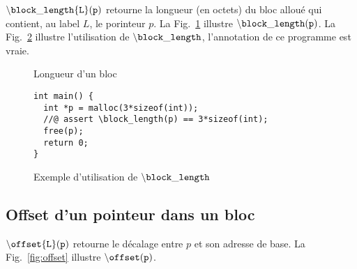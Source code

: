 ${\tt \backslash block\_length\{L\}(p)}$ retourne la longueur (en octets) du
bloc alloué qui contient, au label $L$, le porinteur $p$. La
Fig.~\ref{fig:block-length} illustre ${\tt \backslash block\_length(p)}$. La
Fig.~\ref{fig:block-length-example} illustre l'utilisation de
${\tt \backslash block\_length}$, l'annotation de ce programme est vraie.


\begin{figure}[h]
  \begin{center}
  \end{center}
  \caption{Longueur d'un bloc}
  \label{fig:block-length}
\end{figure}


\begin{figure}[h]
\begin{lstlisting}
int main() {
  int *p = malloc(3*sizeof(int));
  //@ assert \block_length(p) == 3*sizeof(int);
  free(p);
  return 0;
}
\end{lstlisting}
\caption{Exemple d'utilisation de ${\tt \backslash block\_length}$}
\label{fig:block-length-example}
\end{figure}



\subsection{Offset d'un pointeur dans un bloc}

${\tt \backslash offset\{L\}(p)}$ retourne le décalage entre $p$ et son adresse
de base. La Fig.~\ref{fig:offset} illustre ${\tt \backslash offset(p)}$.


